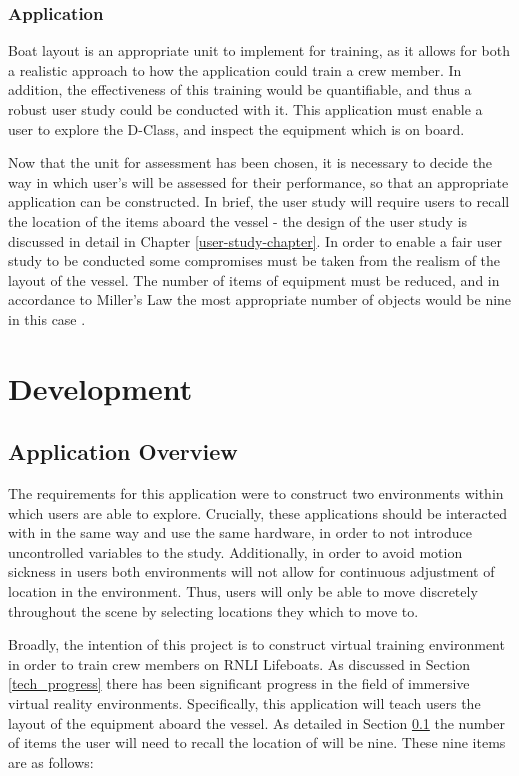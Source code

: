 \documentclass[ %
                    author={Elis Jones},
                supervisor={Dr. Kirsten Cater},
                    degree={BSc},
                     title={The Effect of Presentation Medium on Spatial Cognition},
                  subtitle={in the Virtual Environment},
                      year={2018} ]{dissertation}
\begin{document}
\subsection{Application}\label{application-approach}
Boat layout is an appropriate unit to implement for training, as it allows for both a realistic approach to how the application could train a crew member. In addition, the effectiveness of this training would be  quantifiable, and thus a robust user study could be conducted with it. This application must enable a user to explore the D-Class, and inspect the equipment which is on board.

Now that the unit for assessment has been chosen, it is necessary to decide the way in which user's will be assessed for their performance, so that an appropriate application can be constructed. In brief, the user study will require users to recall the location of the items aboard the vessel - the design of the user study is discussed in detail in Chapter \ref{user-study-chapter}. In order to enable a fair user study to be conducted some compromises must be taken from the realism of the layout of the vessel. The number of items of equipment must be reduced, and in accordance to Miller's Law the most appropriate number of objects would be nine in this case \cite{Miller1956}. 

\chapter{Development}

\section{Application Overview}
The requirements for this application were to construct two environments within which users are able to explore. Crucially, these applications should be interacted with in the same way and use the same hardware, in order to not introduce uncontrolled variables to the study. Additionally, in order to avoid motion sickness in users both environments will not allow for continuous adjustment of location in the environment. Thus, users will only be able to move discretely throughout the scene by selecting locations they which to move to. 

Broadly, the intention of this project is to construct virtual training environment in order to train crew members on RNLI Lifeboats. As discussed in Section \ref{tech_progress} there has been significant progress in the field of immersive virtual reality environments. Specifically, this application will teach users the layout of the equipment aboard the vessel. As detailed in Section \ref{application-approach} the number of items the user will need to recall the location of will be nine. These nine items are as follows:
\end{document}
